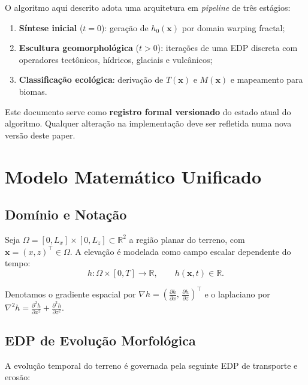 \documentclass[11pt,a4paper]{article}
\begin{document}
O algoritmo aqui descrito adota uma arquitetura em \emph{pipeline} de três estágios:

\begin{enumerate}
  \item \textbf{Síntese inicial} ($t = 0$): geração de $h_0(\mathbf{x})$ por domain warping fractal;
  \item \textbf{Escultura geomorphológica} ($t > 0$): iterações de uma EDP discreta com operadores
        tectônicos, hídricos, glaciais e vulcânicos;
  \item \textbf{Classificação ecológica}: derivação de $T(\mathbf{x})$ e $M(\mathbf{x})$ e mapeamento
        para biomas.
\end{enumerate}

Este documento serve como \textbf{registro formal versionado} do estado atual do algoritmo.
Qualquer alteração na implementação deve ser refletida numa nova versão deste paper.

\section{Modelo Matemático Unificado}

\subsection{Domínio e Notação}

Seja $\Omega = [0, L_x] \times [0, L_z] \subset \mathbb{R}^2$ a região planar do terreno,
com $\mathbf{x} = (x, z)^\top \in \Omega$. A elevação é modelada como campo escalar
dependente do tempo:
\begin{equation}
  h : \Omega \times [0, T] \longrightarrow \mathbb{R}, \qquad h(\mathbf{x}, t) \in \mathbb{R}.
\end{equation}

Denotamos o gradiente espacial por $\nabla h = \left(\frac{\partial h}{\partial x},\,
\frac{\partial h}{\partial z}\right)^\top$ e o laplaciano por $\nabla^2 h = \frac{\partial^2 h}{\partial x^2}
+ \frac{\partial^2 h}{\partial z^2}$.

\subsection{EDP de Evolução Morfológica}

A evolução temporal do terreno é governada pela seguinte EDP de transporte e erosão:
\end{document}
